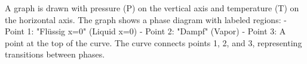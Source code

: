 A graph is drawn with pressure (P) on the vertical axis and temperature (T) on the horizontal axis. The graph shows a phase diagram with labeled regions:  
- Point 1: "Flüssig x=0" (Liquid x=0)  
- Point 2: "Dampf" (Vapor)  
- Point 3: A point at the top of the curve.  
The curve connects points 1, 2, and 3, representing transitions between phases.